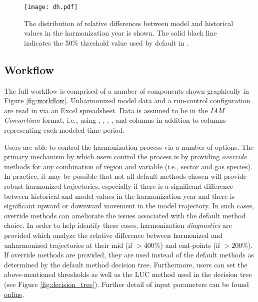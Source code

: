 \begin{figure}
  \begin{center}
    \texttt{[image: dh.pdf]}
    \caption[]{
      \label{fig:dh}
      The distribution of relative differences between model and historical
      values in the harmonization year is shown. The solid black line indicates
      the 50\% threshold value used by default in .  
% 
% 
    }
  \end{center}
\end{figure}

\subsection{ Workflow}\label{sec:workflow}

The full  workflow is comprised of a number of components shown
graphically in Figure \ref{fig:workflow}. Unharmonized model data and a
run-control configuration are read in via an Excel spreadsheet. Data is assumed
to be in the \textit{IAM Consortium} format, i.e., using ,
, , , and  columns in
addition to columns representing each modeled time period. 

Users are able to control the harmonization process via a number of options. The
primary mechanism by which users control the process is by providing
\textit{override} methods for any combination of region and variable (i.e.,
sector and gas species).  In practice, it may be possible that not all default
methods chosen will provide robust harmonized trajectories, especially if there
is a significant difference between historical and model values in the
harmonization year and there is significant upward or downward movement in the
model trajectory. In such cases, override methods can ameliorate the issues
associated with the default method choice. In order to help identify these
cases, harmonization \textit{diagnostics} are provided which analyze the
relative difference between harmonized and unharmonized trajectories at their
mid (if $> 400$\%) and end-points (if $> 200$\%). If override methods are
provided, they are used instead of the default methods as determined by the
default method decision tree. Furthermore, users can set the above-mentioned
thresholds as well as the LUC method used in the decision tree (see Figure
\ref{fig:decision_tree}). Further detail of input parameters can be found
\href{http://mattgidden.com/aneris/config.html}{online}.

